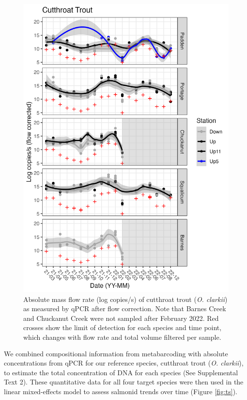 \documentclass[
]{article}
\begin{document}
\begin{figure}
\centering
\includegraphics{../Output/Figures/modeled_cut_qpcr_updown_flowcorrected.png}
\caption{Absolute mass flow rate (log copies/s) of cutthroat trout
(\emph{O. clarkii}) as measured by qPCR after flow correction. Note that
Barnes Creek and Chuckanut Creek were not sampled after February 2022.
Red crosses show the limit of detection for each species and time point,
which changes with flow rate and total volume filtered per
sample.\label{fig:qpcr}}
\end{figure}

We combined compositional information from metabarcoding with absolute
concentrations from qPCR for our reference species, cutthroat trout
(\emph{O. clarkii}), to estimate the total concentration of DNA for each
species (See Supplemental Text 2). These quantitative data for all four
target species were then used in the linear mixed-effects model to
assess salmonid trends over time (Figure \ref{fig:ts}).
\end{document}
